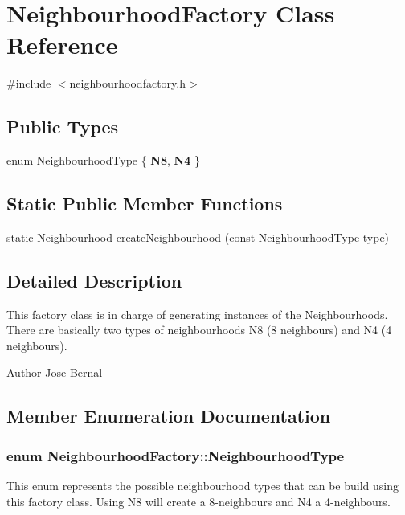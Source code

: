 \hypertarget{classNeighbourhoodFactory}{\section{Neighbourhood\-Factory Class Reference}
\label{classNeighbourhoodFactory}
}


{\ttfamily \#include $<$neighbourhoodfactory.\-h$>$}

\subsection*{Public Types}
\begin{DoxyCompactItemize}
\item 
enum \hyperlink{classNeighbourhoodFactory_a299ccbd341de315b0e7bf5cf868bf72b}{Neighbourhood\-Type} \{ {\bfseries N8}, 
{\bfseries N4}
 \}
\end{DoxyCompactItemize}
\subsection*{Static Public Member Functions}
\begin{DoxyCompactItemize}
\item 
static \hyperlink{classNeighbourhood}{Neighbourhood} \hyperlink{classNeighbourhoodFactory_a2d492970c0ba303bc2e9302ea03ee467}{create\-Neighbourhood} (const \hyperlink{classNeighbourhoodFactory_a299ccbd341de315b0e7bf5cf868bf72b}{Neighbourhood\-Type} type)
\end{DoxyCompactItemize}


\subsection{Detailed Description}
This factory class is in charge of generating instances of the Neighbourhoods. There are basically two types of neighbourhoods N8 (8 neighbours) and N4 (4 neighbours).

\begin{DoxyAuthor}{Author}
Jose Bernal 
\end{DoxyAuthor}


\subsection{Member Enumeration Documentation}
\hypertarget{classNeighbourhoodFactory_a299ccbd341de315b0e7bf5cf868bf72b}{
\subsubsection[{Neighbourhood\-Type}]{\setlength{\rightskip}{0pt plus 5cm}enum {\bf Neighbourhood\-Factory\-::\-Neighbourhood\-Type}}}\label{classNeighbourhoodFactory_a299ccbd341de315b0e7bf5cf868bf72b}
This enum represents the possible neighbourhood types that can be build using this factory class. Using N8 will create a 8-\/neighbours and N4 a 4-\/neighbours. 

